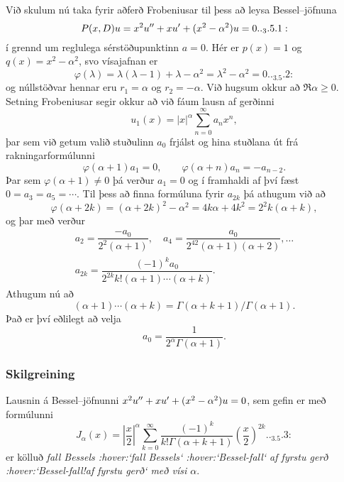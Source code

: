 \noindent
Við skulum nú taka fyrir aðferð Frobeniusar
til þess að leysa Bessel--jöfnuna
 \begin{equation*}P(x,D)u=x^2u\ddash+xu\dash+(x^2-\alpha^2)u=0


.. _3.5.1:

 \end{equation*}
í grennd um reglulega sérstöðupunktinn $a=0$.  
Hér er  $p(x)=1$ og $q(x)=x^2-\alpha^2$, svo vísajafnan er
 \begin{equation*}\varphi(\lambda)=\lambda(\lambda-1)+\lambda-\alpha^2=
\lambda^2-\alpha^2=0


.. _3.5.2:

 \end{equation*}
og núllstöðvar hennar eru $r_1=\alpha$ og $r_2=-\alpha$.  Við hugsum
okkur að $\Re \alpha\geq 0$.  Setning Frobeniusar segir okkur að við
fáum lausn af gerðinni 
$$ u_1(x)=|x|^\alpha\sum_{n=0}^\infty a_n x^n, $$
þar sem við getum valið stuðulinn $a_0$ frjálst og hina stuðlana út
frá rakningarformúlunni
$$ \varphi(\alpha+1)a_1=0, \qquad \varphi(\alpha+n)a_n=-a_{n-2}. $$
Þar sem $\varphi(\alpha+1)\neq 0$ þá verður $a_1=0$ og í framhaldi af
því fæst $0=a_3=a_5=\cdots$.  Til þess að finna formúluna fyrir
$a_{2k}$ þá athugum við að 
$$\varphi(\alpha+2k)=(\alpha+2k)^2-\alpha^2= 4k\alpha+4k^2=
2^2k(\alpha+k),
$$
og þar með verður 
\begin{gather*}
a_2=\dfrac{-a_0}{2^2(\alpha+1)}, \quad
a_4=\dfrac{a_0}{2^42(\alpha+1)(\alpha+2)}, \dots  \\
a_{2k}=\dfrac{(-1)^ka_0}{2^{2k}k!(\alpha+1)\cdots(\alpha+k)}.
\end{gather*}
Athugum nú að 
$$
(\alpha+1)\cdots(\alpha+k)={\Gamma}({\alpha}+k+1)/{\Gamma}({\alpha}+1).
$$
Það er því eðlilegt að velja
 $$a_0=\dfrac 1{2^\alpha\Gamma(\alpha+1)}.
 $$
\subsubsection{Skilgreining}
Lausnin á Bessel--jöfnunni $x^2u{\sp{\prime\prime}}+xu{\sp{\prime}}+(x^2-\alpha^2)u=0$, sem
gefin er með formúlunni
 \begin{equation*}J_\alpha(x)=\left|\dfrac x2\right|^\alpha\sum_{k=0}^\infty
\dfrac{(-1)^k}{k!\Gamma(\alpha+k+1)}\left( \dfrac x2\right)^{2k}


.. _3.5.3:

 \end{equation*}
er kölluð {\it fall Bessels :hover:`fall Bessels` :hover:`Bessel-fall`
af fyrstu gerð :hover:`Bessel-fall!af fyrstu gerð` með vísi $\alpha$}.


